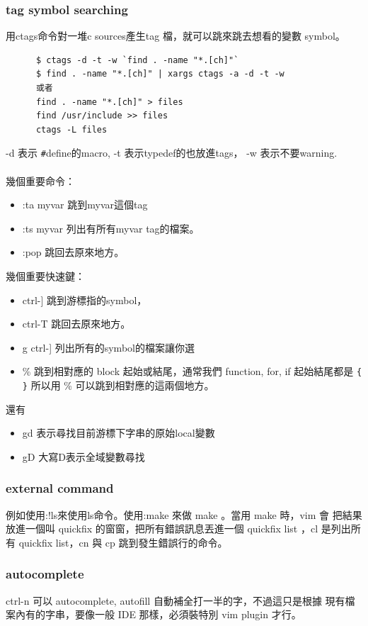       \subsubsection{tag symbol searching}
      用ctags命令對一堆c sources產生tag 檔，就可以跳來跳去想看的變數 symbol。
      \begin{verbatim}
      $ ctags -d -t -w `find . -name "*.[ch]"`
      $ find . -name "*.[ch]" | xargs ctags -a -d -t -w
      或者
      find . -name "*.[ch]" > files
      find /usr/include >> files
      ctags -L files
      \end{verbatim}
      -d 表示 \verb=#=define的macro, -t 表示typedef的也放進tags，
      -w 表示不要warning.
      \\\\
      幾個重要命令：
      \begin{itemize}
        \item :ta myvar 跳到myvar這個tag
        \item :ts myvar 列出有所有myvar tag的檔案。
        \item :pop 跳回去原來地方。
      \end{itemize}
      幾個重要快速鍵：
      \begin{itemize}
        \item ctrl-] 跳到游標指的symbol，
        \item ctrl-T 跳回去原來地方。
        \item g ctrl-] 列出所有的symbol的檔案讓你選
        \item \% 跳到相對應的 block 起始或結尾，通常我們 function, for, if
          起始結尾都是 \verb={ }= 所以用 \% 可以跳到相對應的這兩個地方。
      \end{itemize}
      還有
      \begin{itemize}
        \item gd 表示尋找目前游標下字串的原始local變數
        \item gD 大寫D表示全域變數尋找
      \end{itemize}

      \subsubsection{external command}
      例如使用:!ls來使用ls命令。使用:make 來做 make 。當用 make 時，vim 會
      把結果放進一個叫 quickfix 的窗窗，把所有錯誤訊息丟進一個 quickfix list
      ，cl 是列出所有 quickfix list，cn 與 cp 跳到發生錯誤行的命令。

      \subsubsection{autocomplete}
      ctrl-n 可以 autocomplete, autofill 自動補全打一半的字，不過這只是根據
      現有檔案內有的字串，要像一般 IDE 那樣，必須裝特別 vim plugin 才行。

